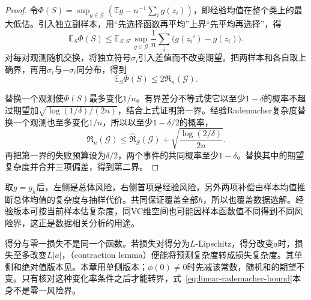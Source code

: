 \begin{proof}
令$\Phi(S)=\sup_{g\in\mathcal G}(\mathbb E g-n^{-1}\sum_i g(z_i))$，即经验均值在整个类上的最大低估。引入独立副样本，用“先选择函数再平均”上界“先平均再选择”，得
\[
 \mathbb E_S\Phi(S)
 \leq\mathbb E_{S,S'}\sup_{g\in\mathcal G}
 \frac1n\sum_i\bigl(g(z_i')-g(z_i)\bigr).
\]
对每对观测随机交换，将独立符号$\sigma_i$引入差值而不改变期望。把两样本和各自取上确界，再用$\sigma_i$与$-\sigma_i$同分布，得到
\begin{equation}
 \mathbb E_S\Phi(S)\leq2\mathfrak R_n(\mathcal G).
 \label{eq:rademacher-symmetrization}
\end{equation}

替换一个观测使$\Phi(S)$最多变化$1/n$。有界差分不等式使它以至少$1-\delta$的概率不超过期望加$\sqrt{\log(1/\delta)/(2n)}$，结合上式证明第一界。经验Rademacher复杂度替换一个观测也至多变化$1/n$，所以以至少$1-\delta/2$的概率，
\[
 \mathfrak R_n(\mathcal G)
 \leq\widehat{\mathfrak R}_S(\mathcal G)
 +\sqrt{\frac{\log(2/\delta)}{2n}}.
\]
再把第一界的失败预算设为$\delta/2$，两个事件的共同概率至少$1-\delta$。替换其中的期望复杂度并合并三项偏差，得到第二界。
\end{proof}

取$g=g_h$后，左侧是总体风险，右侧首项是经验风险，另外两项补偿由样本均值推断总体均值的复杂度与抽样代价。共同保证覆盖全部$h$，所以也覆盖数据选解。经验版本可按当前样本估复杂度，同VC维空间也可能因样本函数值不同得到不同风险界，这正是数据相关分析的用途。

得分与零一损失不是同一个函数。若损失对得分为$L$-Lipschitz，得分改变$a$时，损失至多改变$L|a|$，（contraction lemma）便能将预测复杂度转成损失复杂度。其单侧和绝对值版本见。本章用单侧版本；$\phi(0)\neq0$时先减该常数，随机和的期望不变。只有核对这种变化率条件之后才能转界，式~\eqref{eq:linear-rademacher-bound}本身不是零一风险界。

